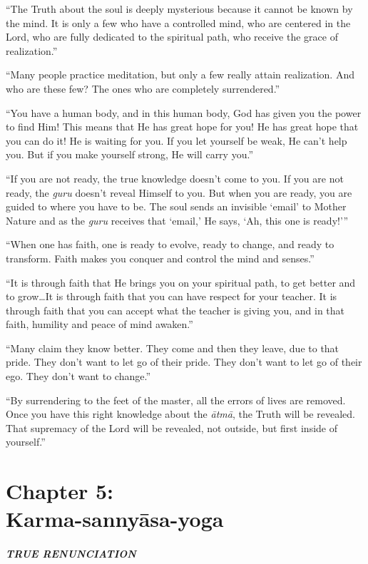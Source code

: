\documentclass[12pt, twoside, openright]{memoir}
\begin{document}
\enquote{The Truth about the soul is deeply mysterious because it cannot be known by the mind. It is only a few who have a controlled mind, who are centered in the Lord, who are fully dedicated to the spiritual path, who receive the grace of realization.}

\enquote{Many people practice meditation, but only a few really attain realization. And who are these few? The ones who are completely surrendered.}

\enquote{You have a human body, and in this human body, God has given you the power to find Him! This means that He has great hope for you! He has great hope that you can do it! He is waiting for you. If you let yourself be weak, He can’t help you. But if you make yourself strong, He will carry you.}

\enquote{If you are not ready, the true knowledge doesn’t come to you. If you are not ready, the \textit{guru} doesn’t reveal Himself to you. But when you are ready, you are guided to where you have to be. The soul sends an invisible \enquote{email} to Mother Nature and as the \textit{guru} receives that \enquote{email,} He says, \enquote{Ah, this one is ready!}}

\enquote{When one has faith, one is ready to evolve, ready to change, and ready to transform. Faith makes you conquer and control the mind and senses.}

\enquote{It is through faith that He brings you on your spiritual path, to get better and to grow\ldots It is through faith that you can have respect for your teacher. It is through faith that you can accept what the teacher is giving you, and in that faith, humility and peace of mind awaken.}

\enquote{Many claim they know better. They come and then they leave, due to that pride. They don’t want to let go of their pride. They don’t want to let go of their ego. They don’t want to change.}

\enquote{By surrendering to the feet of the master, all the errors of lives are removed. Once you have this right knowledge about the \textit{ātmā}, the Truth will be revealed. That supremacy of the Lord will be revealed, not outside, but first inside of yourself.}
 \chapter{Chapter 5: \\Karma-sannyāsa-yoga}\label{chap-karma-sannyasa-yoga}

\paragraph*{\MakeUppercase{True Renunciation}}
\end{document}
